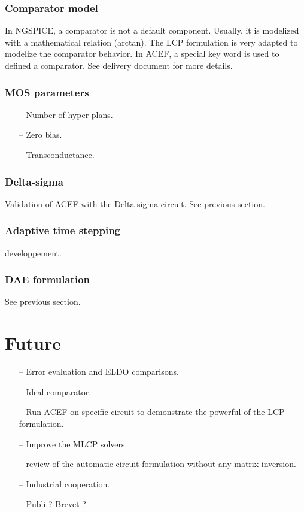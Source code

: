 \subsubsection{Comparator model}
In NGSPICE, a comparator is not a default component. Usually, it is modelized with a mathematical
relation (arctan). The LCP formulation is very adapted to modelize the comparator behavior. In ACEF,
a special key word is used to defined a comparator.
See delivery document for more details.

\subsubsection{MOS parameters}

 \begin{itemize}
  \item[--] Number of hyper-plans. 
  \item[--] Zero bias.
  \item[--] Transconductance.
\end{itemize}

\subsubsection{Delta-sigma}
Validation of ACEF with the Delta-sigma circuit. See previous section.

\subsubsection{Adaptive time stepping}
developpement.

\subsubsection{DAE formulation}
See previous section.

\section{Future}
 \begin{itemize}
  \item[--] Error evaluation and ELDO comparisons. 
  \item[--] Ideal comparator. 
  \item[--] Run ACEF on specific circuit to demonstrate the powerful of the LCP formulation.
  \item[--] Improve the MLCP solvers.
  \item[--] review of the automatic circuit formulation without any matrix inversion.
  \item[--] Industrial cooperation.
  \item[--] Publi ? Brevet ?
  
\end{itemize}
